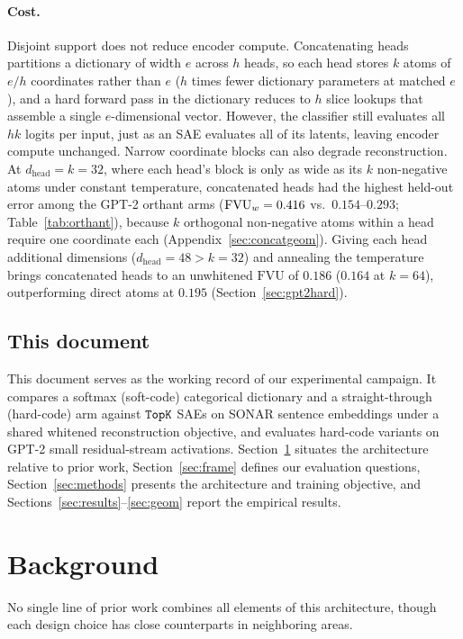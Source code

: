 \paragraph{Cost.}
Disjoint support does not reduce encoder compute. Concatenating heads
partitions a dictionary of width $e$ across $h$ heads, so each head
stores $k$ atoms of $e/h$ coordinates rather than $e$ ($h$ times fewer
dictionary parameters at matched $e$), and a hard forward pass in the
dictionary reduces to $h$ slice lookups that assemble a single
$e$-dimensional vector. However, the classifier still evaluates all $hk$
logits per input, just as an SAE evaluates all of its latents, leaving
encoder compute unchanged. Narrow coordinate blocks can also degrade
reconstruction. At $d_{\mathrm{head}}{=}k{=}32$, where each head's block
is only as wide as its $k$ non-negative atoms under constant temperature,
concatenated heads had the highest held-out error among the GPT-2 orthant
arms ($\mathrm{FVU}_w = 0.416$ vs.\ $0.154$--$0.293$; Table~\ref{tab:orthant}),
because $k$ orthogonal non-negative atoms within a head require one
coordinate each (Appendix~\ref{sec:concatgeom}). Giving each head
additional dimensions ($d_{\mathrm{head}}{=}48 > k{=}32$) and annealing
the temperature brings concatenated heads to an unwhitened $\mathrm{FVU}$
of $0.186$ ($0.164$ at $k{=}64$), outperforming direct atoms at $0.195$
(Section~\ref{sec:gpt2hard}).

\subsection{This document}

This document serves as the working record of our experimental campaign.
It compares a softmax (soft-code) categorical dictionary and a
straight-through (hard-code) arm against $\mathop{\mathtt{TopK}}\limits$ SAEs on SONAR sentence
embeddings under a shared whitened reconstruction objective, and evaluates
hard-code variants on GPT-2 small residual-stream activations.
Section~\ref{sec:background} situates the architecture relative to prior
work, Section~\ref{sec:frame} defines our evaluation questions,
Section~\ref{sec:methods} presents the architecture and training
objective, and Sections~\ref{sec:results}--\ref{sec:geom} report the
empirical results.

\section{Background}
\label{sec:background}

No single line of prior work combines all elements of this architecture,
though each design choice has close counterparts in neighboring areas.

